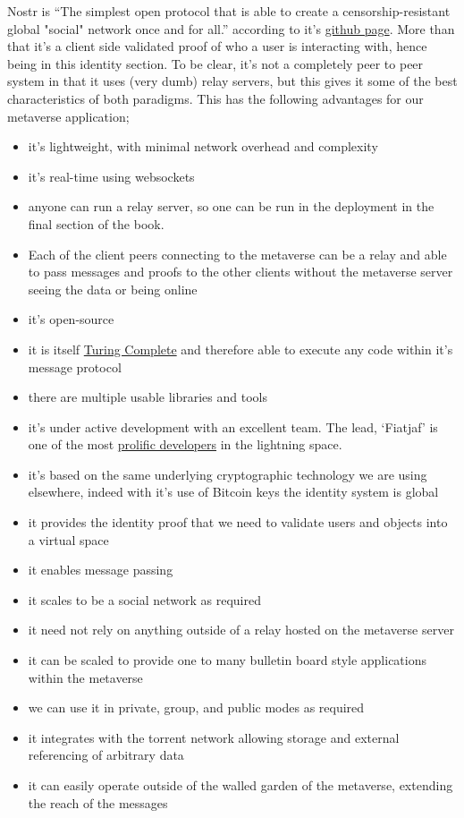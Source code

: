 Nostr is ``The simplest open protocol that is able to create a censorship-resistant global "social" network once and for all.'' according to it's \href{https://github.com/fiatjaf/nostr}{github page}. More than that it's a client side validated proof of who a user is interacting with, hence being in this identity section. To be clear, it's not a completely peer to peer system in that it uses (very dumb) relay servers, but this gives it some of the best characteristics of both paradigms. This has the following advantages for our metaverse application; 
\begin{itemize}
\item it's lightweight, with minimal network overhead and complexity
\item it's real-time using websockets
\item anyone can run a relay server, so one can be run in the deployment in the final section of the book.
\item Each of the client peers connecting to the metaverse can be a relay and able to pass messages and proofs to the other clients without the metaverse server seeing the data or being online 
\item it's open-source
\item it is itself \href{https://snort.social/e/note1evkdgcg0dw8ckyqsqhnk4wy55h7w97twjf8etcq2tr9sv5urlszqjc9p6v}{Turing Complete} and therefore able to execute any code within it's message protocol
\item there are multiple usable libraries and tools
\item it's under active development with an excellent team. The lead, `Fiatjaf' is one of the most \href{https://github.com/fiatjaf}{prolific developers} in the lightning space.
\item it's based on the same underlying cryptographic technology we are using elsewhere, indeed with it's use of Bitcoin keys the identity system is global
\item it provides the identity proof that we need to validate users and objects into a virtual space
\item it enables message passing
\item it scales to be a social network as required
\item it need not rely on anything outside of a relay hosted on the metaverse server
\item it can be scaled to provide one to many bulletin board style applications within the metaverse
\item we can use it in private, group, and public modes as required
\item it integrates with the torrent network allowing storage and external referencing of arbitrary data
\item it can easily operate outside of the walled garden of the metaverse, extending the reach of the messages
\end{itemize} 
